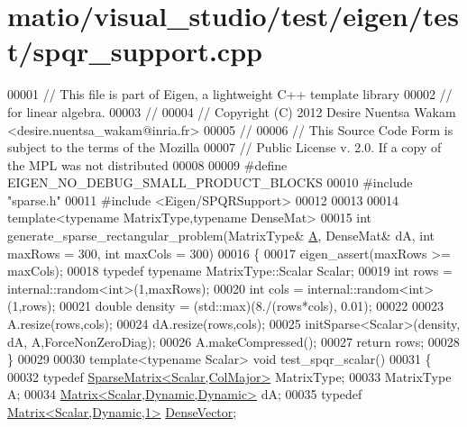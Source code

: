 \hypertarget{matio_2visual__studio_2test_2eigen_2test_2spqr__support_8cpp_source}{}\section{matio/visual\+\_\+studio/test/eigen/test/spqr\+\_\+support.cpp}
\label{matio_2visual__studio_2test_2eigen_2test_2spqr__support_8cpp_source}

\begin{DoxyCode}
00001 \textcolor{comment}{// This file is part of Eigen, a lightweight C++ template library}
00002 \textcolor{comment}{// for linear algebra.}
00003 \textcolor{comment}{//}
00004 \textcolor{comment}{// Copyright (C) 2012 Desire Nuentsa Wakam <desire.nuentsa\_wakam@inria.fr>}
00005 \textcolor{comment}{//}
00006 \textcolor{comment}{// This Source Code Form is subject to the terms of the Mozilla}
00007 \textcolor{comment}{// Public License v. 2.0. If a copy of the MPL was not distributed}
00008 
00009 \textcolor{preprocessor}{#define EIGEN\_NO\_DEBUG\_SMALL\_PRODUCT\_BLOCKS}
00010 \textcolor{preprocessor}{#include "sparse.h"}
00011 \textcolor{preprocessor}{#include <Eigen/SPQRSupport>}
00012 
00013 
00014 \textcolor{keyword}{template}<\textcolor{keyword}{typename} MatrixType,\textcolor{keyword}{typename} DenseMat>
00015 \textcolor{keywordtype}{int} generate\_sparse\_rectangular\_problem(MatrixType& \hyperlink{group___core___module_class_eigen_1_1_matrix}{A}, DenseMat& dA, \textcolor{keywordtype}{int} maxRows = 300, \textcolor{keywordtype}{int} maxCols = 300)
00016 \{
00017   eigen\_assert(maxRows >= maxCols);
00018   \textcolor{keyword}{typedef} \textcolor{keyword}{typename} MatrixType::Scalar Scalar;
00019   \textcolor{keywordtype}{int} rows = internal::random<int>(1,maxRows);
00020   \textcolor{keywordtype}{int} cols = internal::random<int>(1,rows);
00021   \textcolor{keywordtype}{double} density = (std::max)(8./(rows*cols), 0.01);
00022   
00023   A.resize(rows,cols);
00024   dA.resize(rows,cols);
00025   initSparse<Scalar>(density, dA, A,ForceNonZeroDiag);
00026   A.makeCompressed();
00027   \textcolor{keywordflow}{return} rows;
00028 \}
00029 
00030 \textcolor{keyword}{template}<\textcolor{keyword}{typename} Scalar> \textcolor{keywordtype}{void} test\_spqr\_scalar()
00031 \{
00032   \textcolor{keyword}{typedef} \hyperlink{group___sparse_core___module}{SparseMatrix<Scalar,ColMajor>} MatrixType; 
00033   MatrixType A;
00034   \hyperlink{group___core___module}{Matrix<Scalar,Dynamic,Dynamic>} dA;
00035   \textcolor{keyword}{typedef} \hyperlink{group___core___module}{Matrix<Scalar,Dynamic,1>} \hyperlink{group___core___module}{DenseVector};

\end{DoxyCode}
